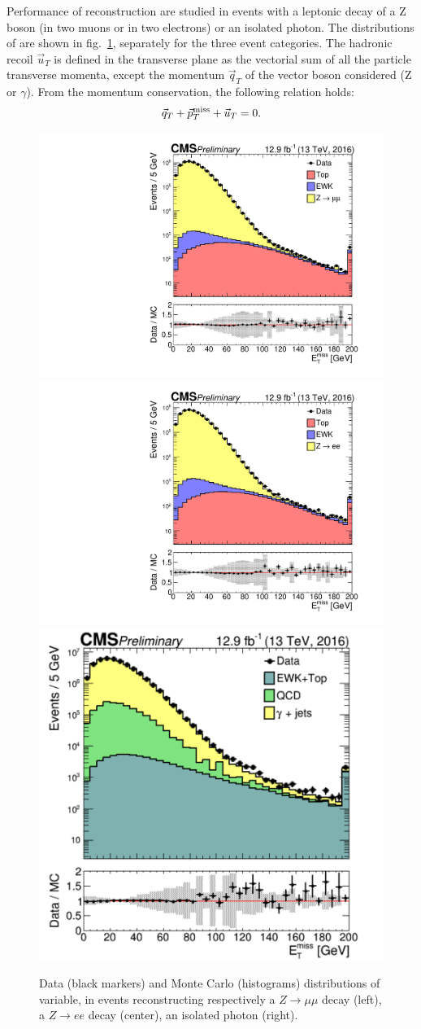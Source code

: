 \noindent Performance of \MET reconstruction are studied in events with a leptonic decay of a Z boson (in two muons or in two electrons) or an isolated photon. The distributions of \MET are shown in fig.~\ref{fig:recoil_distribution}, separately for the three event categories. The hadronic recoil $\vec{u}_T$ is defined in the transverse plane as the vectorial sum of all the particle transverse momenta, except the momentum $\vec{q}_T$ of the vector boson considered (Z or $\gamma$). From the momentum conservation, the following relation holds:
\begin{equation}
\vec{q}_T + \vec{p}_T^{\text{miss}} + \vec{u}_T = 0.
\label{eq:recoil_def}
\end{equation}

\begin{figure}[!htb]
  \centering
    \includegraphics[width=.33\textwidth]{figures/MetPlots/distr_mu.pdf}%
    \includegraphics[width=.33\textwidth]{figures/MetPlots/distr_ele.pdf}%
    \includegraphics[width=.33\textwidth]{figures/MetPlots/distr_gamma.pdf}


  \caption{Data (black markers) and Monte Carlo (histograms) distributions of \MET variable, in events reconstructing respectively a $Z \rightarrow \mu \mu$ decay (left), a $Z \rightarrow e e$ decay (center), an isolated photon (right).}
  \label{fig:recoil_distribution}
\end{figure}

